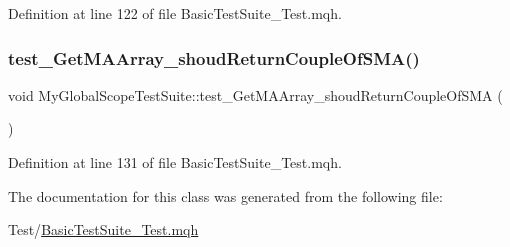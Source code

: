 Definition at line 122 of file Basic\+Test\+Suite\+\_\+\+Test.\+mqh.

\mbox{\label{class_my_global_scope_test_suite_a0b70c8c23cd8d6595cac8f6b7da3cc07}} 
\subsubsection{\texorpdfstring{test\+\_\+\+Get\+M\+A\+Array\+\_\+shoud\+Return\+Couple\+Of\+S\+M\+A()}{test\_GetMAArray\_shoudReturnCoupleOfSMA()}}
{\footnotesize\ttfamily void My\+Global\+Scope\+Test\+Suite\+::test\+\_\+\+Get\+M\+A\+Array\+\_\+shoud\+Return\+Couple\+Of\+S\+MA (\begin{DoxyParamCaption}{ }\end{DoxyParamCaption})\hspace{0.3cm}{\ttfamily [inline]}}



Definition at line 131 of file Basic\+Test\+Suite\+\_\+\+Test.\+mqh.



The documentation for this class was generated from the following file\+:\begin{DoxyCompactItemize}
\item 
Test/\mbox{\hyperlink{_basic_test_suite___test_8mqh}{Basic\+Test\+Suite\+\_\+\+Test.\+mqh}}\end{DoxyCompactItemize}
